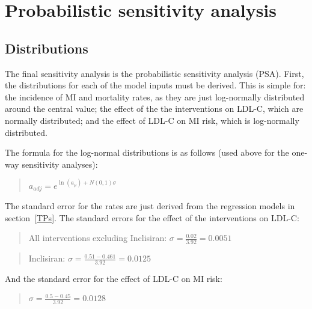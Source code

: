 \documentclass[11pt]{article}
\begin{document}
\clearpage
\pagebreak
\section{Probabilistic sensitivity analysis}

\subsection{Distributions}

The final sensitivity analysis is the probabilistic sensitivity analysis (PSA). 
First, the distributions for each of the model inputs must be derived. 
This is simple for: the incidence of MI and mortality rates, as they are just log-normally
distributed around the central value; the effect of the the interventions on LDL-C, which are normally distributed; 
and the effect of LDL-C on MI risk, which is log-normally distributed. 

The formula for the log-normal distributions is as follows (used above for the one-way sensitivity analyses): 

\begin{quote}
\begin{math}
a_{adj} = e^{\ln(a_\mu)+N(0,1) \sigma}
\end{math}
\end{quote}

The standard error for the rates are just derived from the regression models in section~\ref{TPs}.
The standard errors for the effect of the interventions on LDL-C: 

\begin{quote}
All interventions excluding Inclisiran:
\begin{math}
\sigma = \frac{0.02}{3.92} = 0.0051
\end{math}
\end{quote}

\begin{quote}
Inclisiran:
\begin{math}
\sigma = \frac{0.51-0.461}{3.92} = 0.0125
\end{math}
\end{quote}

And the standard error for the effect of LDL-C on MI risk: 

\begin{quote}
\begin{math}
\sigma = \frac{0.5-0.45}{3.92} = 0.0128
\end{math}
\end{quote}
\end{document}
